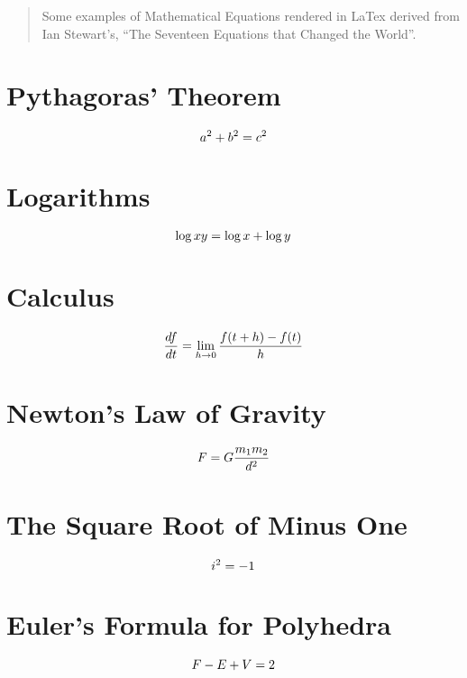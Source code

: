 \documentclass[]{article}
\title{}
\author{}
\begin{document}
\maketitle

\begin{abstract}
Some examples of Mathematical Equations rendered in LaTex derived from Ian Stewart's, ``The Seventeen Equations that Changed the World''.
\end{abstract}


\section{Pythagoras' Theorem}

{\fontsize{30pt}{36pt}\selectfont
	\[
	\LARGE{
		a^2 + b^2 = c^2
	}
	\]


\section{Logarithms}

{\fontsize{30pt}{36pt}\selectfont
\[
\LARGE{
	\log x y = \log x + \log y
}
\]
	
\section{Calculus}

{\fontsize{30pt}{36pt}\selectfont
\[
\LARGE{
	\frac{df}{dt} = \lim_{h \rightarrow 0} \frac{f(t+h) - f(t)}{h}
}
\]
	
\section{Newton's Law of Gravity}

{\fontsize{30pt}{36pt}\selectfont
\[
\LARGE{
	F = G \frac{m_1 m_2}{d^2}
}
\]
	
}\section{The Square Root of Minus One}

{\fontsize{30pt}{36pt}\selectfont
\[
\LARGE{
	i^2 = -1
}
\]
}

\section{Euler's Formula for Polyhedra}

{\fontsize{30pt}{36pt}\selectfont
\[
\LARGE{
	F - E + V = 2
}
\]
}


}}}
\end{document}
